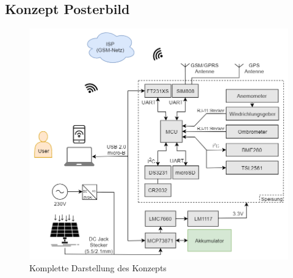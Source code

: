 \begin{appendix}
\newpage

\section{Konzept Posterbild}
\label{sec:konzept_posterbild}
\begin{figure}[h]
\centering
\includegraphics[width=\textwidth]{graphics/Konzeptdiagramme/komplett.PNG}
\caption{Komplette Darstellung des Konzepts}
\label{fig:konzept_posterbild}
\end{figure}
\newpage
\begin{landscape}

\end{landscape}
\end{appendix}

